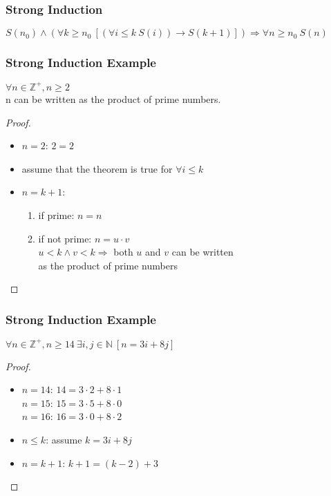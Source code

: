 \documentclass[dvipsnames]{beamer}
\begin{document}
\begin{frame}
  \frametitle{Strong Induction}

  \begin{definition}
    $S(n_0) \wedge
      (\forall k \geq n_0~[(\forall i \leq k~S(i)) \rightarrow S(k+1)])
      \Rightarrow \forall n \geq n_0~S(n)$
  \end{definition}
\end{frame}

\begin{frame}
  \frametitle{Strong Induction Example}

  \begin{theorem}
    $\forall n \in \mathbb{Z}^+, n \geq 2$\\
      n can be written as the product of prime numbers.
  \end{theorem}

  \pause
  \begin{proof}
    \begin{itemize}
      \item $n=2$: $2=2$

      \pause
      \item assume that the theorem is true for $\forall i \leq k$

      \pause
      \item $n=k+1$:
      \begin{enumerate}
        \item if prime: $n=n$

        \pause
        \item if not prime: $n=u \cdot v$\\
          $u < k \wedge v < k \Rightarrow$ both $u$ and $v$ can be written\\
          as the product of prime numbers
      \end{enumerate}
    \end{itemize}
  \end{proof}
\end{frame}

\begin{frame}
  \frametitle{Strong Induction Example}

  \begin{theorem}
    $\forall n \in \mathbb{Z}^+, n \geq 14~\exists i,j \in \mathbb{N}~[n=3i+8j]$
  \end{theorem}

  \pause
  \begin{proof}
    \begin{itemize}
      \item $n=14$: $14=3 \cdot 2 + 8 \cdot 1$\\
        $n=15$: $15=3 \cdot 5 + 8 \cdot 0$\\
        $n=16$: $16=3 \cdot 0 + 8 \cdot 2$

      \pause
      \item $n \leq k$: assume $k=3i+8j$

      \pause
      \item $n=k+1$: $k+1=(k-2)+3$
    \end{itemize}
  \end{proof}
\end{frame}
\end{document}
